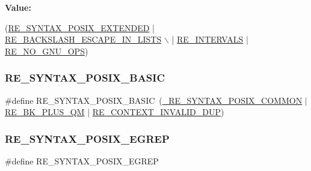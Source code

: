 {\bfseries Value\+:}
\begin{DoxyCode}
(\hyperlink{a00092_a18701b3ee3894b158993efa18f3958ec}{RE\_SYNTAX\_POSIX\_EXTENDED} | \hyperlink{a00092_a45356e84c34c98ed125ea5f75814ccc5}{RE\_BACKSLASH\_ESCAPE\_IN\_LISTS}        
      \(\backslash\)
   | \hyperlink{a00092_a377bd32fc62adedc890f74cd18845aa9}{RE\_INTERVALS}       | \hyperlink{a00092_af60fbd1f693bfb95fd0a80caae9aa4c5}{RE\_NO\_GNU\_OPS})
\end{DoxyCode}
\mbox{\label{a00092_af0f03965e6d6bdc7576fe863c81bb7af}} 
\subsubsection{\texorpdfstring{R\+E\+\_\+\+S\+Y\+N\+T\+A\+X\+\_\+\+P\+O\+S\+I\+X\+\_\+\+B\+A\+S\+IC}{RE\_SYNTAX\_POSIX\_BASIC}}
{\footnotesize\ttfamily \#define R\+E\+\_\+\+S\+Y\+N\+T\+A\+X\+\_\+\+P\+O\+S\+I\+X\+\_\+\+B\+A\+S\+IC~(\hyperlink{a00092_a7ff4656f125a3d46461419e33451db1b}{\+\_\+\+R\+E\+\_\+\+S\+Y\+N\+T\+A\+X\+\_\+\+P\+O\+S\+I\+X\+\_\+\+C\+O\+M\+M\+ON} $\vert$ \hyperlink{a00092_a94bdc20e1e83b401d2725902a642aa1e}{R\+E\+\_\+\+B\+K\+\_\+\+P\+L\+U\+S\+\_\+\+QM} $\vert$ \hyperlink{a00092_a971ea0a3bfa08571da05bdc4b0f5faf5}{R\+E\+\_\+\+C\+O\+N\+T\+E\+X\+T\+\_\+\+I\+N\+V\+A\+L\+I\+D\+\_\+\+D\+UP})}

\mbox{\label{a00092_afdcbffe1bb41d8a584fb56013bb2f059}} 
\subsubsection{\texorpdfstring{R\+E\+\_\+\+S\+Y\+N\+T\+A\+X\+\_\+\+P\+O\+S\+I\+X\+\_\+\+E\+G\+R\+EP}{RE\_SYNTAX\_POSIX\_EGREP}}
{\footnotesize\ttfamily \#define R\+E\+\_\+\+S\+Y\+N\+T\+A\+X\+\_\+\+P\+O\+S\+I\+X\+\_\+\+E\+G\+R\+EP}

